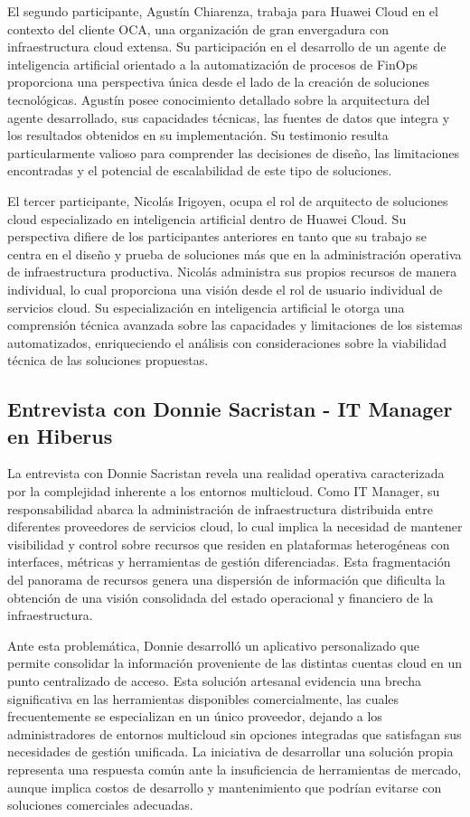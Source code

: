 El segundo participante, Agustín Chiarenza, trabaja para Huawei Cloud en el contexto del cliente OCA, una organización de gran envergadura con infraestructura cloud extensa. Su participación en el desarrollo de un agente de inteligencia artificial orientado a la automatización de procesos de FinOps proporciona una perspectiva única desde el lado de la creación de soluciones tecnológicas. Agustín posee conocimiento detallado sobre la arquitectura del agente desarrollado, sus capacidades técnicas, las fuentes de datos que integra y los resultados obtenidos en su implementación. Su testimonio resulta particularmente valioso para comprender las decisiones de diseño, las limitaciones encontradas y el potencial de escalabilidad de este tipo de soluciones.

El tercer participante, Nicolás Irigoyen, ocupa el rol de arquitecto de soluciones cloud especializado en inteligencia artificial dentro de Huawei Cloud. Su perspectiva difiere de los participantes anteriores en tanto que su trabajo se centra en el diseño y prueba de soluciones más que en la administración operativa de infraestructura productiva. Nicolás administra sus propios recursos de manera individual, lo cual proporciona una visión desde el rol de usuario individual de servicios cloud. Su especialización en inteligencia artificial le otorga una comprensión técnica avanzada sobre las capacidades y limitaciones de los sistemas automatizados, enriqueciendo el análisis con consideraciones sobre la viabilidad técnica de las soluciones propuestas.

\subsection{Entrevista con Donnie Sacristan - IT Manager en Hiberus}

La entrevista con Donnie Sacristan revela una realidad operativa caracterizada por la complejidad inherente a los entornos multicloud. Como IT Manager, su responsabilidad abarca la administración de infraestructura distribuida entre diferentes proveedores de servicios cloud, lo cual implica la necesidad de mantener visibilidad y control sobre recursos que residen en plataformas heterogéneas con interfaces, métricas y herramientas de gestión diferenciadas. Esta fragmentación del panorama de recursos genera una dispersión de información que dificulta la obtención de una visión consolidada del estado operacional y financiero de la infraestructura.

Ante esta problemática, Donnie desarrolló un aplicativo personalizado que permite consolidar la información proveniente de las distintas cuentas cloud en un punto centralizado de acceso. Esta solución artesanal evidencia una brecha significativa en las herramientas disponibles comercialmente, las cuales frecuentemente se especializan en un único proveedor, dejando a los administradores de entornos multicloud sin opciones integradas que satisfagan sus necesidades de gestión unificada. La iniciativa de desarrollar una solución propia representa una respuesta común ante la insuficiencia de herramientas de mercado, aunque implica costos de desarrollo y mantenimiento que podrían evitarse con soluciones comerciales adecuadas.


